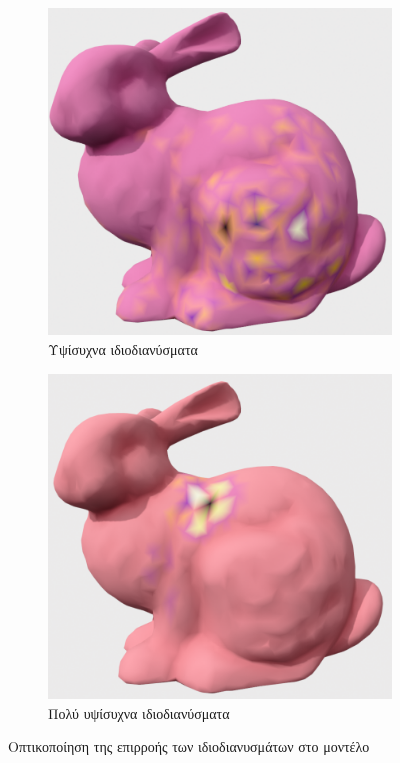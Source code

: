 \documentclass[draft]{article}
\begin{document}
\begin{figure}[h]
\begin{subfigure}{0.5\textwidth}
	\end{subfigure}
	\begin{subfigure}{0.5\textwidth}
		\includegraphics[width=0.9\linewidth]{"h_freq.png"}
		\caption{Υψίσυχνα ιδιοδιανύσματα}
		\label{fig:vis3}
	\end{subfigure}
	\begin{subfigure}{0.5\textwidth}
		\includegraphics[width=0.9\linewidth]{"vh_freq.png"}
		\caption{Πολύ υψίσυχνα ιδιοδιανύσματα}
		\label{fig:vis4}
	\end{subfigure}
	\caption{Οπτικοποίηση της επιρροής των ιδιοδιανυσμάτων στο μοντέλο}
\end{figure}
\end{document}
